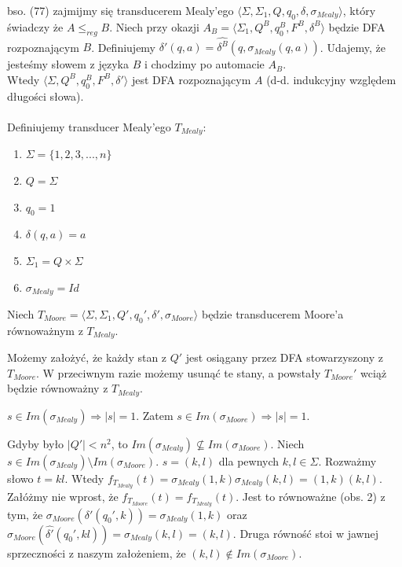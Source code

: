 \documentclass[a4paper,11pt]{article}
\newenvironment{zadanie}[1]
  {\renewcommand\theinnercustomthm{#1}\innercustomthm}
  {\endinnercustomthm}
\newenvironment{obserwacja}[1]
  {\renewcommand\theinnercustomobs{#1}\innercustomobs}
  {\endinnercustomobs}
\begin{document}
\begin{zadanie}{78}
\end{zadanie}
bso. (77) zajmijmy się transducerem Mealy'ego $\langle \Sigma, \Sigma_1, Q, q_0, \delta, \sigma_{Mealy} \rangle$, który 
świadczy że $A \leqslant_{reg}B$. Niech przy okazji $A_B = \langle \Sigma_1, Q^B, q_0^B, F^B, \delta^B\rangle$ będzie DFA
rozpoznającym $B$. Definiujemy $\delta'(q,a) = \widehat{\delta^B}(q,\sigma_{Mealy}(q,a))$. Udajemy, że jesteśmy słowem z języka
$B$ i chodzimy po automacie $A_B$.\\
Wtedy $\langle \Sigma, Q^B, q_0^B, F^B, \delta' \rangle$ jest DFA rozpoznającym $A$ (d-d. indukcyjny względem długości słowa). \\ \\

\begin{zadanie}{79}
\end{zadanie}
Definiujemy transducer Mealy'ego $T_{Mealy}$:
\begin{enumerate}
 \item $\Sigma = \{1,2,3,...,n\}$
 \item $Q = \Sigma$
 \item $q_0 = 1$
 \item $\delta(q,a) = a$
 \item $\Sigma_1 = Q \times \Sigma$
 \item $\sigma_{Mealy} = Id$
\end{enumerate}

Niech $T_{Moore} = \langle \Sigma, \Sigma_1, Q', q_0', \delta', \sigma_{Moore} \rangle$ będzie transducerem Moore'a 
równoważnym z $T_{Mealy}$.

\begin{obserwacja}{1}
 Możemy założyć, że każdy stan z $Q'$ jest osiągany przez DFA stowarzyszony z $T_{Moore}$. W przeciwnym razie możemy usunąć te 
 stany, a powstały $T_{Moore}'$ wciąż będzie równoważny z $T_{Mealy}$.
\end{obserwacja}

\begin{obserwacja}{2}
 $s \in Im(\sigma_{Mealy}) \Rightarrow |s| = 1$. Zatem $s \in Im(\sigma_{Moore}) \Rightarrow |s| = 1$.
\end{obserwacja}

Gdyby było $|Q'| < n^2$, to $Im(\sigma_{Mealy}) \nsubseteq Im(\sigma_{Moore})$. Niech 
$s \in Im(\sigma_{Mealy}) \setminus Im(\sigma_{Moore})$. $s = (k,l)$ dla pewnych $k,l \in \Sigma$. Rozważmy słowo
$t = kl$. Wtedy $f_{T_{Mealy}}(t) = \sigma_{Mealy}(1,k) \sigma_{Mealy}(k,l) = (1,k)(k,l)$. \\
Załóżmy nie wprost, że $f_{T_{Moore}}(t) = f_{T_{Mealy}}(t)$. Jest to równoważne (obs. 2) z tym, że 
$\sigma_{Moore}(\delta'(q_0',k)) = \sigma_{Mealy}(1,k)$ oraz 
$\sigma_{Moore}(\widehat{\delta'}(q_0',kl)) = \sigma_{Mealy}(k,l) = (k,l)$. 
Druga równość stoi w jawnej sprzeczności z naszym założeniem, że $(k,l) \notin Im(\sigma_{Moore})$.
\end{document}
